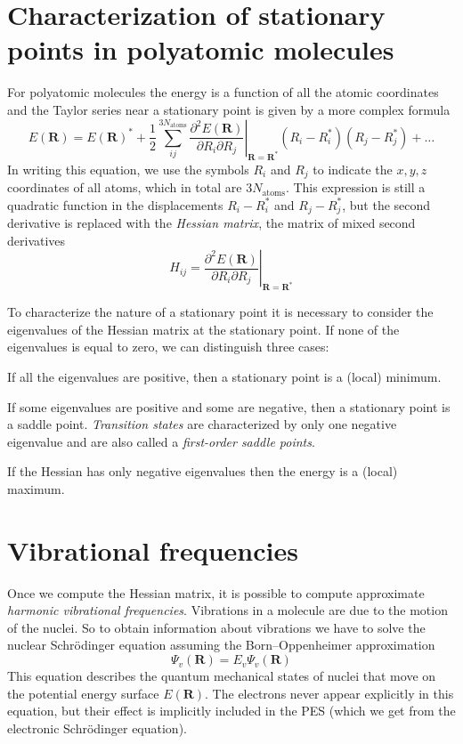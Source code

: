 \documentclass[../Main/chem371-notes.tex]{subfiles}
\begin{document}
\section{Characterization of stationary points in polyatomic molecules}

For polyatomic molecules the energy is a function of all the atomic coordinates and the Taylor series near a stationary point is given by a more complex formula
\begin{equation}
E(\mathbf{R}) =
E(\mathbf{R})^*
+\frac{1}{2}
\sum_{ij}^{3 N_\mathrm{atoms}} \left.\frac{\partial^2 E(\mathbf{R})}{\partial R_i \partial R_j}\right|_{\mathbf{R}=\mathbf{R}^*} (R_i - R_i^*) (R_j - R_j^*) + \ldots 
\end{equation}
In writing this equation, we use the symbols $R_i$ and $R_j$ to indicate the $x,y,z$ coordinates of all atoms, which in total are $3 N_\mathrm{atoms}$.
This expression is still a quadratic function in the displacements $R_i - R_i^*$ and $R_j - R_j^*$, but the second derivative is replaced with the \emph{Hessian matrix}, the matrix of mixed second derivatives
\begin{equation}
H_{ij} = 
\left.\frac{\partial^2 E(\mathbf{R})}{\partial R_i \partial R_j}\right|_{\mathbf{R}=\mathbf{R}^*}
\end{equation}

To characterize the nature of a stationary point it is necessary to consider the eigenvalues of the Hessian matrix at the stationary point.
If none of the eigenvalues is equal to zero, we can distinguish three cases:
\begin{myitems}
\item If all the eigenvalues are positive, then a stationary point is a (local) minimum.
\item If some eigenvalues are positive and some are negative, then a stationary point is a saddle point.
\emph{Transition states} are characterized by only one negative eigenvalue and are also called a \emph{first-order saddle points}.
\item If the Hessian has only negative eigenvalues then the energy is a (local) maximum.
\end{myitems}

\section{Vibrational frequencies}

Once we compute the Hessian matrix, it is possible to compute approximate \emph{harmonic vibrational frequencies}.
Vibrations in a molecule are due to the motion of the nuclei.
So to obtain information about vibrations we have to solve the nuclear Schr\"{o}dinger equation assuming the Born--Oppenheimer approximation
\begin{equation}
[\hat{T}_\mathrm{n} + E(\mathbf{R}) ] \Psi_v(\mathbf{R}) = E_v \Psi_v(\mathbf{R})
\end{equation}
This equation describes the quantum mechanical states of nuclei that move on the potential energy surface $E(\mathbf{R})$.
The electrons never appear explicitly in this equation, but their effect is implicitly included in the PES (which we get from the electronic Schr\"{o}dinger equation).
\end{document}
